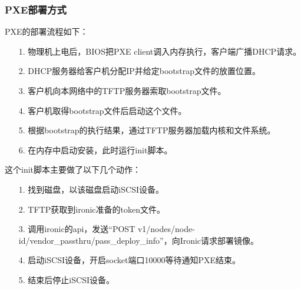 \documentclass[a4paper,left=1.5cm,right=1.5cm,11pt]{article}
\begin{document}
\subsubsection{PXE部署方式}
	PXE的部署流程如下：
	\begin{itemize}
		\item[1.] 物理机上电后，BIOS把PXE client调入内存执行，客户端广播DHCP请求。
		\item[2.] DHCP服务器给客户机分配IP并给定bootstrap文件的放置位置。
		\item[3.] 客户机向本网络中的TFTP服务器索取bootstrap文件。
		\item[4.] 客户机取得bootstrap文件后启动这个文件。
		\item[5.] 根据bootstrap的执行结果，通过TFTP服务器加载内核和文件系统。
		\item[6.] 在内存中启动安装，此时运行init脚本。
	\end{itemize}

	这个init脚本主要做了以下几个动作：
	\begin{itemize}
		\item[1.] 找到磁盘，以该磁盘启动iSCSI设备。
		\item[2.] TFTP获取到ironic准备的token文件。
		\item[3.] 调用ironic的api，发送“POST v1/nodes/{node-id}/vendor\_passthru/pass\_deploy\_info”，向Ironic请求部署镜像。
		\item[4.] 启动iSCSI设备，开启socket端口10000等待通知PXE结束。
		\item[5.] 结束后停止iSCSI设备。
	\end{itemize}
\end{document}
